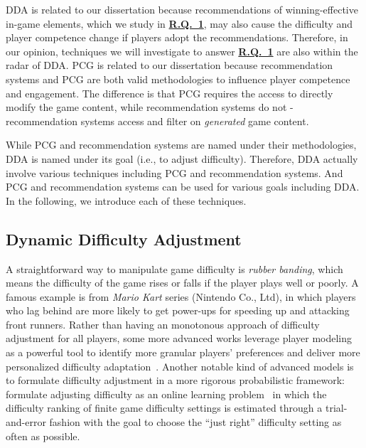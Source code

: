 DDA is related to our dissertation because recommendations of winning-effective in-game elements, which we study in \hyperref[rq1]{\textbf{R.Q.~1}}, may also cause the difficulty and player competence change if players adopt the recommendations. Therefore, in our opinion, techniques we will investigate to answer \hyperref[rq1]{\textbf{R.Q.~1}} are also within the radar of DDA. PCG is related to our dissertation because  recommendation systems and PCG are both valid methodologies to influence player competence and engagement. The difference is that PCG requires the access to directly modify the game content, while recommendation systems do not - recommendation systems access and filter on  \textit{generated} game content. 

While PCG and recommendation systems are named under their methodologies, DDA is named under its goal (i.e., to adjust difficulty). Therefore, DDA actually involve various techniques including PCG and recommendation systems. And PCG and recommendation systems can be used for various goals including DDA. In the following, we introduce each of these techniques.






\subsection{Dynamic Difficulty Adjustment}

A straightforward way to manipulate game difficulty is \textit{rubber banding}, which means the difficulty of the game rises or falls if the player plays well or poorly. A famous example is from \textit{Mario Kart} series (Nintendo Co., Ltd), in which players who lag behind are more likely to get power-ups for speeding up and attacking front runners. Rather than having an monotonous approach of difficulty adjustment for all players, some more advanced works leverage player modeling~\cite{yannakakis2013player} as a powerful tool to identify more granular players' preferences and deliver more personalized difficulty adaptation~\cite{missura2009player,togelius2006making,yannakakis2005player,zook2012temporal}. Another notable kind of advanced models is to formulate difficulty adjustment in a more rigorous probabilistic framework: \cite{missura2011predicting} formulate adjusting difficulty as an online learning problem~\cite{auer1995gambling} in which the difficulty ranking of finite game difficulty settings is estimated through a trial-and-error fashion with the goal to choose the ``just right'' difficulty setting as often as possible. 

